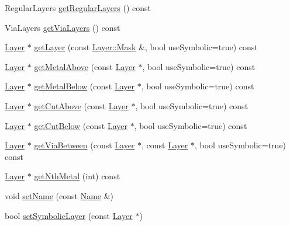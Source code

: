 \begin{DoxyCompactItemize}
\item 
Regular\+Layers \mbox{\hyperlink{classHurricane_1_1Technology_abffce542bc1cee054b4a09c64449f3b8}{get\+Regular\+Layers}} () const
\item 
Via\+Layers \mbox{\hyperlink{classHurricane_1_1Technology_aacde973f6a02a232a01f3f618576e1ee}{get\+Via\+Layers}} () const
\item 
\mbox{\hyperlink{classHurricane_1_1Layer}{Layer}} $\ast$ \mbox{\hyperlink{classHurricane_1_1Technology_a2ab8d2c386bf3daeb2b93d92ecbac6b4}{get\+Layer}} (const \mbox{\hyperlink{classHurricane_1_1Layer_af5277c670637bd5d910237e7afe01a91}{Layer\+::\+Mask}} \&, bool use\+Symbolic=true) const
\item 
\mbox{\hyperlink{classHurricane_1_1Layer}{Layer}} $\ast$ \mbox{\hyperlink{classHurricane_1_1Technology_af5723b08c9d289ffef8159ac2ea71b74}{get\+Metal\+Above}} (const \mbox{\hyperlink{classHurricane_1_1Layer}{Layer}} $\ast$, bool use\+Symbolic=true) const
\item 
\mbox{\hyperlink{classHurricane_1_1Layer}{Layer}} $\ast$ \mbox{\hyperlink{classHurricane_1_1Technology_ae02123406c7362cc14413727e8689d5a}{get\+Metal\+Below}} (const \mbox{\hyperlink{classHurricane_1_1Layer}{Layer}} $\ast$, bool use\+Symbolic=true) const
\item 
\mbox{\hyperlink{classHurricane_1_1Layer}{Layer}} $\ast$ \mbox{\hyperlink{classHurricane_1_1Technology_ac7125a8eea871918e74bb295c56caceb}{get\+Cut\+Above}} (const \mbox{\hyperlink{classHurricane_1_1Layer}{Layer}} $\ast$, bool use\+Symbolic=true) const
\item 
\mbox{\hyperlink{classHurricane_1_1Layer}{Layer}} $\ast$ \mbox{\hyperlink{classHurricane_1_1Technology_a3ca39dccc7e19b404181f55777e1b933}{get\+Cut\+Below}} (const \mbox{\hyperlink{classHurricane_1_1Layer}{Layer}} $\ast$, bool use\+Symbolic=true) const
\item 
\mbox{\hyperlink{classHurricane_1_1Layer}{Layer}} $\ast$ \mbox{\hyperlink{classHurricane_1_1Technology_a8209708bc594a307ea39f15a39bbf196}{get\+Via\+Between}} (const \mbox{\hyperlink{classHurricane_1_1Layer}{Layer}} $\ast$, const \mbox{\hyperlink{classHurricane_1_1Layer}{Layer}} $\ast$, bool use\+Symbolic=true) const
\item 
\mbox{\hyperlink{classHurricane_1_1Layer}{Layer}} $\ast$ \mbox{\hyperlink{classHurricane_1_1Technology_a81a3f3e479aeb686c61a2d0fa2931f3b}{get\+Nth\+Metal}} (int) const
\item 
void \mbox{\hyperlink{classHurricane_1_1Technology_a247b75d5cbb85198cea9e5e609304cd0}{set\+Name}} (const \mbox{\hyperlink{classHurricane_1_1Name}{Name}} \&)
\item 
bool \mbox{\hyperlink{classHurricane_1_1Technology_a26c12c5828acaeb33068a2899df1134b}{set\+Symbolic\+Layer}} (const \mbox{\hyperlink{classHurricane_1_1Layer}{Layer}} $\ast$)
\end{DoxyCompactItemize}
